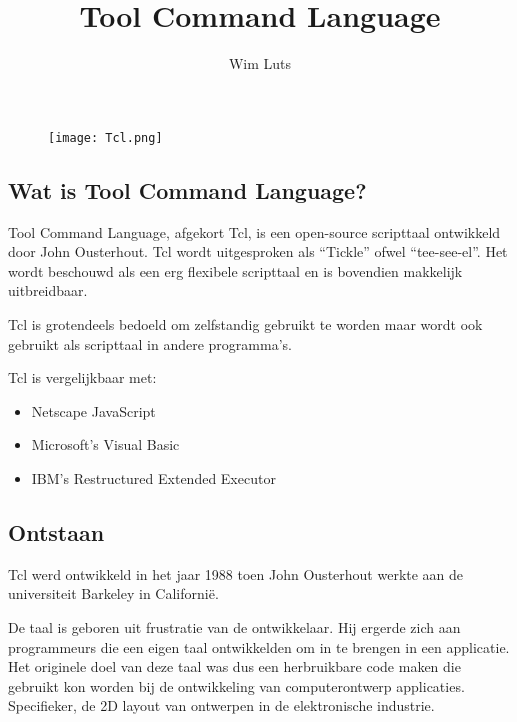 \documentclass{article}
\begin{document}
\begin{titlepage}
\title{Tool Command Language}
\author{Wim Luts}
\date{}
\maketitle
\begin{center}
\begin{figure}[htp]
\centering
\texttt{[image: Tcl.png]}
\caption{}
\label{Logo}
\end{figure}
\end{center}
\end{titlepage}
\newpage
\begin{center}
\tableofcontents
\listoffigures
\listoftables
\end{center}

\newpage
\begin{flushleft}
\section{Wat is Tool Command Language?}
Tool Command Language, afgekort Tcl, is een open-source scripttaal ontwikkeld door John Ousterhout. Tcl wordt uitgesproken als “Tickle” ofwel “tee-see-el”. Het wordt beschouwd als een erg flexibele scripttaal en is bovendien makkelijk uitbreidbaar.\medskip

Tcl is grotendeels bedoeld om zelfstandig gebruikt te worden maar wordt ook gebruikt als scripttaal in andere programma’s.\medskip

Tcl is vergelijkbaar met:
\begin{itemize}
	\item Netscape JavaScript
	\item Microsoft's Visual Basic
	\item IBM's Restructured Extended Executor
\end{itemize}
\subsection{Ontstaan}
Tcl werd ontwikkeld in het jaar 1988 toen John Ousterhout werkte aan de universiteit Barkeley in Californië.\medskip

De taal is geboren uit frustratie van de ontwikkelaar. Hij ergerde zich aan programmeurs die een eigen taal ontwikkelden om in te brengen in een applicatie. Het originele doel van deze taal was dus een herbruikbare code maken die gebruikt kon worden bij de ontwikkeling van computerontwerp applicaties. Specifieker, de 2D layout van ontwerpen in de elektronische industrie.\medskip


\end{flushleft}
\end{document}
